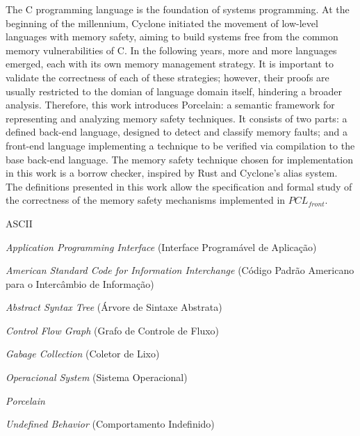 \documentclass[cic,tc]{iiufrgs}
\begin{document}
\begin{translatedabstract}
The C programming language is the foundation of systems programming. At the beginning of the millennium, Cyclone initiated the movement of low-level languages with memory safety, aiming to build systems free from the common memory vulnerabilities of C. In the following years, more and more languages emerged, each with its own memory management strategy. It is important to validate the correctness of each of these strategies; however, their proofs are usually restricted to the domian of language domain itself, hindering a broader analysis. Therefore, this work introduces Porcelain: a semantic framework for representing and analyzing memory safety techniques. It consists of two parts: a defined back-end language, designed to detect and classify memory faults; and a front-end language implementing a technique to be verified via compilation to the base back-end language. The memory safety technique chosen for implementation in this work is a borrow checker, inspired by Rust and Cyclone’s alias system. The definitions presented in this work allow the specification and formal study of the correctness of the memory safety mechanisms implemented in $PCL_{front}$.
\end{translatedabstract}

\listoffigures

\listoftables

\begin{listofabbrv}{ASCII}
    \item[API] \emph{Application Programming Interface} (Interface Programável de Aplicação)
	\item[ASCII] \emph{American Standard Code for Information Interchange} (Código Padrão Americano para o Intercâmbio de Informação)
    \item[AST] \emph{Abstract Syntax Tree} (Árvore de Sintaxe Abstrata)
    \item[CFG] \emph{Control Flow Graph} (Grafo de Controle de Fluxo)
    \item[GC] \emph{Gabage Collection} (Coletor de Lixo)
    \item[OS] \emph{Operacional System} (Sistema Operacional)
    \item[PCL] \emph{Porcelain}
    \item[UB] \emph{Undefined Behavior} (Comportamento Indefinido)
\end{listofabbrv}
\end{document}
